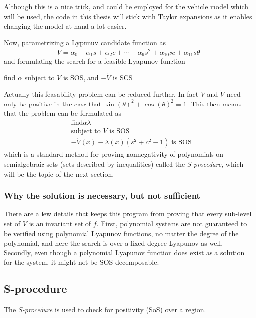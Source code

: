 Although this is a nice trick, and could be employed for the vehicle model which
will be used, the code in this thesis will stick with Taylor expansions as it
enables changing the model at hand a lot easier.

Now, parametrizing a Lypunuv candidate function as
\[
  V = \alpha_0 + \alpha_1s + \alpha_2c + \cdots + \alpha_9s^2 + \alpha_{10}sc +
  \alpha_{11}s\dot{\theta}
\]
and formulating the search for a feasible Lyapunov function
\begin{example}
  find \(\alpha\) subject to \(V\) is SOS, and \(-\dot{V}\) is SOS
\end{example}

Actually this feasability problem can be reduced further. In fact \(V\) and
\(\dot{V}\) need only be positive in the case that \(\sin{(\theta)}^2 +
\cos{(\theta)}^2 = 1\). This then means that the problem can be formulated as
\begin{align*}
  &\text{find}\alpha \lambda \\
  &\text{subject to } V \text{ is SOS} \\
  &-\dot{V}(x) - \lambda(x)\left( s^2 + c^2 -1 \right) \text{ is SOS}
\end{align*}
which is a standard method for proving nonnegativity of polynomials on
semialgebraic sets (sets described by inequalities) called the
\textit{S-procedure}, which will be the topic of the next section.

\subsubsection{Why the solution is necessary, but not sufficient}

There are a few details that keeps this program from proving that every
sub-level set of \(V\) is an invariant set of \(f\). First, polynomial systems
are not guaranteed to be verified using polynomial Lyapunov functions, no matter
the degree of the polynomial, and here the search is over a fixed degree
Lyapunov as well. Secondly, even though a polynomial Lyapunov function does
exist as a solution for the system, it might not be \ac{SOS} decomposable.

\subsection{S-procedure}
\label{sec:s-procedure}

The \textit{S-procedure} is used to check for positivity (SoS) over a region.

